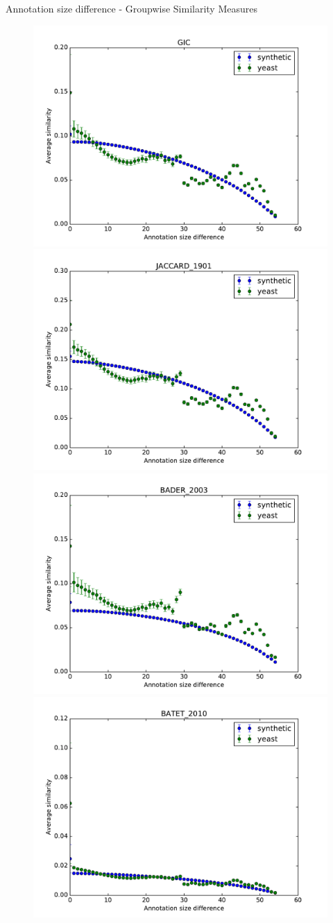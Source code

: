 \documentclass{beamer}
\begin{document}
\begin{frame}{Annotation size difference - Groupwise Similarity Measures}
\begin{figure}
\includegraphics[width=0.5\linewidth, height=0.4\textheight]{groupwise_diff/SIM_GROUPWISE_DAG_GIC_diff.pdf}
\includegraphics[width=0.5\linewidth, height=0.4\textheight]{groupwise_diff/SIM_FRAMEWORK_DAG_SET_JACCARD_1901_diff.pdf} \\
\includegraphics[width=0.5\linewidth, height=0.4\textheight]{groupwise_diff/SIM_FRAMEWORK_DAG_SET_BADER_2003_diff.pdf}
\includegraphics[width=0.5\linewidth, height=0.4\textheight]{groupwise_diff/SIM_FRAMEWORK_DAG_SET_BATET_2010_diff.pdf}
\end{figure}
\end{frame}
\end{document}
